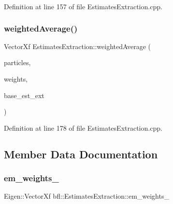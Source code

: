 Definition at line 157 of file Estimates\+Extraction.\+cpp.

\mbox{\label{classbfl_1_1EstimatesExtraction_a9b5c02da5cdeabceae31a1f66e772854}} 
\subsubsection{\texorpdfstring{weighted\+Average()}{weightedAverage()}}
{\footnotesize\ttfamily Vector\+Xf Estimates\+Extraction\+::weighted\+Average (\begin{DoxyParamCaption}\item[{const Eigen\+::\+Ref$<$ const Eigen\+::\+Matrix\+Xf $>$ \&}]{particles,  }\item[{const Eigen\+::\+Ref$<$ const Eigen\+::\+Vector\+Xf $>$ \&}]{weights,  }\item[{const \mbox{\hyperlink{classbfl_1_1EstimatesExtraction_a8c0593a43166c569530947107c830462}{Statistics}} \&}]{base\+\_\+est\+\_\+ext }\end{DoxyParamCaption})\hspace{0.3cm}{\ttfamily [protected]}}



Definition at line 178 of file Estimates\+Extraction.\+cpp.



\subsection{Member Data Documentation}
\mbox{\label{classbfl_1_1EstimatesExtraction_a1c56946582ef80ccade49e29fa91efad}} 
\subsubsection{\texorpdfstring{em\+\_\+weights\+\_\+}{em\_weights\_}}
{\footnotesize\ttfamily Eigen\+::\+Vector\+Xf bfl\+::\+Estimates\+Extraction\+::em\+\_\+weights\+\_\+\hspace{0.3cm}{\ttfamily [protected]}}



